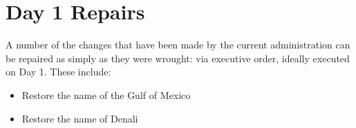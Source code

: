 \chapter{Day 1 Repairs}
A number of the changes that have been made by the current administration can be repaired as simply as they were wrought: via executive order, ideally executed on Day 1. These include:

\begin{itemize}
\item Restore the name of the Gulf of Mexico
\item Restore the name of Denali
\end{itemize}